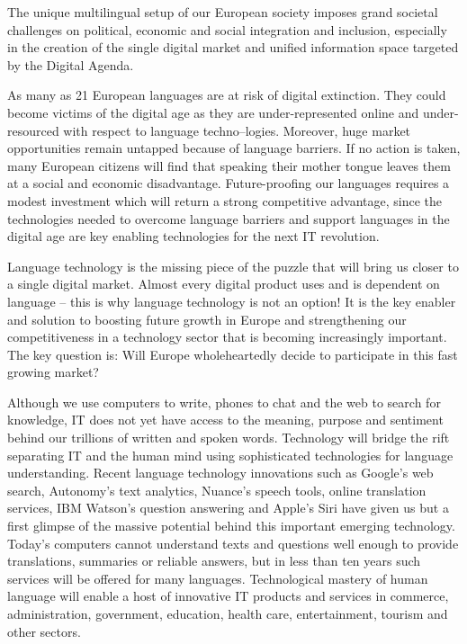 \documentclass[10pt, plain]{../../metanetpaper}
\begin{document}
\cleardoublepage


{}

\begin{multicols}{2}
The unique multilingual setup of our European society imposes grand societal challenges on political, economic and social integration and inclusion, especially in the creation of the single digital market and uniﬁed information space targeted by the Digital Agenda. 

As many as 21 European languages are at risk of digital extinction. They could become victims of the digital age as they are under-represented online and under-resourced with respect to language techno–logies. Moreover, huge market opportunities remain untapped because of language barriers. If no action is taken, many European citizens will ﬁnd that speaking their mother tongue leaves them at a social and economic disadvantage. Future-prooﬁng our languages requires a modest investment which will return a strong competitive advantage, since the technologies needed to overcome language barriers and support languages in the digital age are key enabling technologies for the next IT revolution. 

Language technology is the missing piece of the puzzle that will bring us closer to a single digital market. Almost every digital product uses and is dependent on language -- this is why language technology is not an option! It is the key enabler and solution to boosting future growth in Europe and strengthening our competitiveness in a technology sector that is becoming increasingly important. The key question is: Will Europe wholeheartedly decide to participate in this fast growing market?

Although we use computers to write, phones to chat and the web to search for knowledge, IT does not yet have access to the meaning, purpose and sentiment behind our trillions of written and spoken words. Technology will bridge the rift separating IT and the human mind using sophisticated technologies for language understanding. Recent language technology innovations such as Google’s web search, Autonomy’s text analytics, Nuance’s speech tools, online translation services, IBM Watson’s question answering and Apple’s Siri have given us but a ﬁrst glimpse of the massive potential behind this important emerging technology. Today’s computers cannot understand texts and questions well enough to provide translations, summaries or reliable answers, but in less than ten years such services will be oﬀered for many languages. Technological mastery of human language will enable a host of innovative IT products and services in commerce, administration, government, education, health care, entertainment, tourism and other sectors.


\end{multicols}
\end{document}

